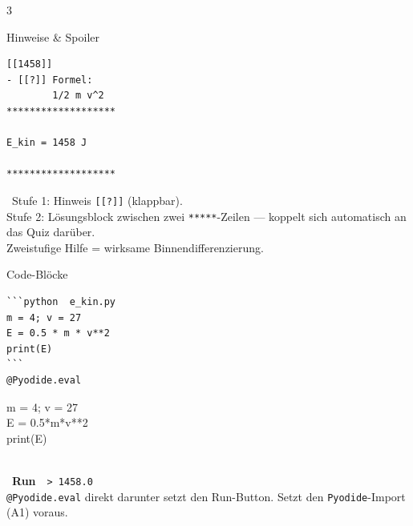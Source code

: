 \documentclass[a4paper,landscape,9pt]{extarticle}
\newcommand{\prevsm}[1]{{\footnotesize\color{muted} #1}}
\begin{document}
\begin{multicols}{3}

\begin{liacard}{Hinweise \& Spoiler}
\begin{lstlisting}[language=lia]
[[1458]]
- [[?]] Formel:
        1/2 m v^2
*******************

E_kin = 1458 J

*******************
\end{lstlisting}
\tcblower
\prevsm{\faQuestionCircle~Stufe 1: Hinweis \texttt{[[?]]}
(klappbar).\\[3pt]
Stufe 2: Lösungsblock zwischen zwei
\texttt{*****}-Zeilen --- koppelt sich
automatisch an das Quiz darüber.\\[2pt]
{\footnotesize Zweistufige Hilfe = wirksame Binnendifferenzierung.}}
\end{liacard}

\begin{liacard}{Code-Blöcke}
\begin{lstlisting}[language=lia]
```python  e_kin.py
m = 4; v = 27
E = 0.5 * m * v**2
print(E)
```
@Pyodide.eval
\end{lstlisting}
\tcblower
\prevsm{\colorbox{codebg}{\parbox{0.85\linewidth}{\ttfamily\scriptsize m = 4; v = 27\\E = 0.5*m*v**2\\print(E)}}\\[2pt]
\faPlay~\textbf{Run}~~\textcolor{liagreen}{\texttt{> 1458.0}}\\[2pt]
{\footnotesize \texttt{@Pyodide.eval} direkt darunter setzt den
Run-Button. Setzt den \texttt{Pyodide}-Import (A1) voraus.}}
\end{liacard}

\end{multicols}
\end{document}

